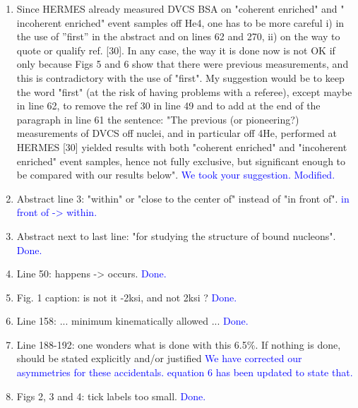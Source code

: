 \documentclass[a4paper,11pt,twoside]{article}
\begin{document}
\begin{enumerate}

\item Since HERMES already measured DVCS BSA on "coherent enriched" and "
   incoherent enriched" event samples off He4, one has to be more careful i) in 
      the use of ''first'' in the abstract and on lines 62 and 270, ii) on the 
      way to quote or qualify ref. [30]. In any case, the way it is done now is 
      not OK if only because Figs 5 and 6 show that there were previous 
      measurements, and this is contradictory with the use of "first". My 
      suggestion would be to keep the word "first" (at the risk of having 
      problems with a referee), except maybe in line 62, to remove the ref 30 
      in line 49 and to add at the end of the paragraph in line 61 the 
      sentence: "The previous (or pioneering?) measurements of DVCS off nuclei, 
      and in particular off 4He, performed at HERMES [30] yielded results with 
      both "coherent enriched" and "incoherent enriched" event samples, hence 
      not fully exclusive, but significant enough to be compared with our 
      results below".
\textcolor{blue}{We took your suggestion. Modified.}

   \item Abstract line 3: "within" or "close to the center of" instead of "in 
      front of".
\textcolor{blue}{in front of -> within.}

   \item Abstract next to last line: "for studying the structure of bound 
      nucleons".
\textcolor{blue}{Done.}

   \item Line 50: happens -> occurs.
\textcolor{blue}{Done.}

   \item Fig. 1 caption: is not it -2ksi, and not 2ksi ?
\textcolor{blue}{Done.}

   \item Line 158: ... minimum kinematically allowed ...
\textcolor{blue}{Done.}

   \item Line 188-192: one wonders what is done with this 6.5\%. If nothing is 
      done, should be stated explicitly and/or justified
\textcolor{blue}{We have corrected our asymmetries for these accidentals.
      equation 6 has been updated to state that.}\\

   \item Figs 2, 3 and 4: tick labels too small.
\textcolor{blue}{Done.}


\end{enumerate}
\end{document}
